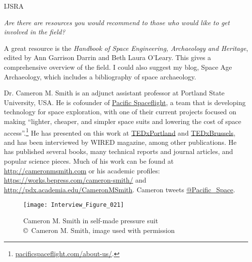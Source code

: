 \begin{labeling}{IJSRA}
	\item[IJSRA] \emph{Are there are resources you would recommend to those who would like to get involved in the field?}

	\item[AG] A great resource is the \emph{Handbook of Space Engineering, Archaeology and Heritage}, edited by Ann Garrison Darrin and Beth Laura O’Leary. This gives a comprehensive overview of the field. I could also suggest my blog, Space Age Archaeology, which includes a bibliography of space archaeology.

\end{labeling}

\IJSRAseparator


Dr. Cameron M. Smith is an adjunct assistant professor at Portland State University, USA. He is cofounder of \href{http://pacificspaceflight.com}{Pacific Spaceflight}, a team that is developing technology for space exploration, with one of their current projects focused on making “lighter, cheaper, and simpler space suits and lowering the cost of space access”.\footnote{\url{pacificspaceflight.com/about-us/}.} He has presented on this work at \href{https://www.youtube.com/watch?v=C17yk-xsZpA}{TEDxPortland} and \href{https://www.youtube.com/watch?v=bMlL0aV75VY}{TEDxBrussels}, and has been interviewed by WIRED magazine, among other publications. He has published several books, many technical reports and journal articles, and popular science pieces. Much of his work can be found at \href{http://cameronmsmith.com}{http://cameronmsmith.com} or his academic profiles: \href{https://works.bepress.com/cameron-smith/}{https://works.bepress.com/cameron-smith/} and \href{http://pdx.academia.edu/CameronMSmith}{http://pdx.academia.edu/CameronMSmith}. Cameron tweets \href{<twitter.com/pacific_space>}{@Pacific\_Space}.

\begin{figure}[!htb]
	\texttt{[image: Interview\_Figure\_021]}
	\centering
	\caption{Cameron M. Smith in self-made pressure suit
		{\normalfont\scriptsize \\ \copyright\ Cameron M. Smith, image used with permission
	}}
	\label{Interview_Figure_021}
\end{figure}

